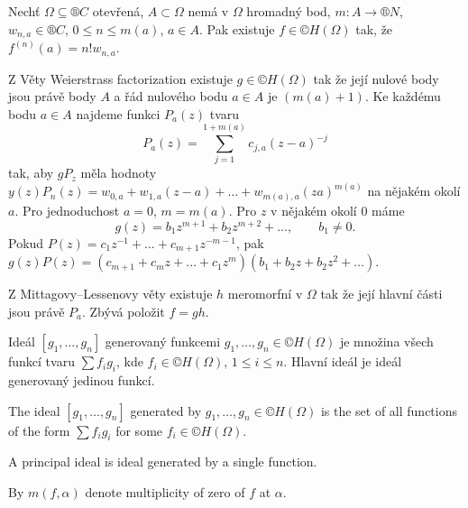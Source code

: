 \documentclass[12pt]{article}					%
\begin{document}
\begin{veta}
	Nechť $Ω \subseteq ®C$ otevřená, $A \subset Ω$ nemá v $Ω$ hromadný bod, $m: A \rightarrow ®N$, $w_{n, a} \in ®C$, $0 ≤ n ≤ m(a)$, $a \in A$. Pak existuje $f \in ©H(Ω)$ tak, že $f^{(n)}(a) = n!w_{n, a}$.

	\begin{dukazin}
		Z Věty Weierstrass factorization existuje $g \in ©H(Ω)$ tak že její nulové body jsou právě body $A$ a řád nulového bodu $a \in A$ je $(m(a) + 1)$. Ke každému bodu $a \in A$ najdeme funkci $P_a(z)$ tvaru
		$$ P_a(z) = \sum_{j=1}^{1 + m(a)} c_{j, a}(z - a)^{-j} $$
		tak, aby $gP_z$ měla hodnoty $y(z)P_n(z) = w_{0, a} + w_{1, a}(z - a) + … + w_{m(a), a}(za)^{m(a)}$ na nějakém okolí $a$. Pro jednoduchost $a = 0$, $m = m(a)$. Pro $z$ v nějakém okolí 0 máme
		$$ g(z) = b_1 z^{m+1} + b_2z^{m + 2} + …, \qquad b_1 ≠ 0. $$
		Pokud $P(z) = c_1 z^{-1} + … + c_{m+1}z^{-m-1}$, pak $g(z)P(z) = (c_{m+1} + c_m z + … + c_1z^m)(b_1 + b_2z + b_2z^2 + …)$.

		Z Mittagovy–Lessenovy věty existuje $h$ meromorfní v $Ω$ tak že její hlavní části jsou právě $P_a$. Zbývá položit $f = gh$.
	\end{dukazin}
\end{veta}

\begin{definice}
	Ideál $[g_1, …, g_n]$ generovaný funkcemi $g_1, …, g_n \in ©H(Ω)$ je množina všech funkcí tvaru $\sum f_i g_i$, kde $f_i \in ©H(Ω)$, $1 ≤ i ≤ n$. Hlavní ideál je ideál generovaný jedinou funkcí.
\end{definice}


\begin{definice}
	The ideal $[g_1, …, g_n]$ generated by $g_1, …, g_n \in ©H(Ω)$ is the set of all functions of the form $\sum f_i g_i$ for some $f_i \in ©H(Ω)$. 

	A principal ideal is ideal generated by a single function.

	By $m(f, α)$ denote multiplicity of zero of $f$ at $α$.
\end{definice}
\end{document}
